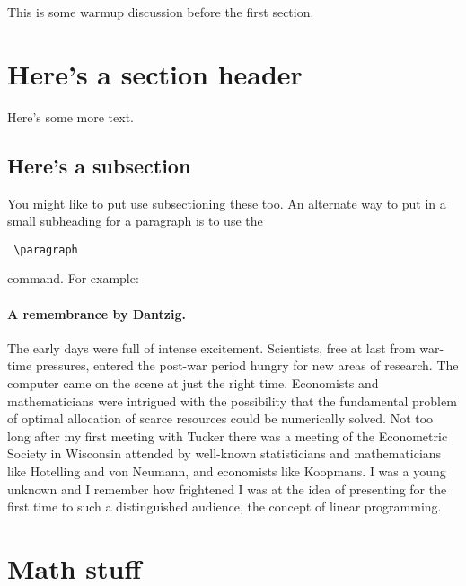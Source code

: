 




This is some warmup discussion before the first section.

\section{Here's a section header}

Here's some more text.

\subsection{Here's a subsection}

You might like to put use subsectioning these too.  An alternate way to put in a small subheading for a paragraph is to use the \begin{verbatim} \paragraph \end{verbatim} command.  For example:

\paragraph{A remembrance by Dantzig.}  The early days were full of intense excitement. Scientists, free at last from war-time pressures, entered the post-war period hungry for new areas of research. The computer came on the scene at just the right time. Economists and mathematicians were intrigued with the possibility that the fundamental problem of optimal allocation of scarce resources could be numerically solved. Not too long after my first meeting with Tucker there was a meeting of the Econometric Society in Wisconsin attended by well-known statisticians and mathematicians like Hotelling and von Neumann, and economists like Koopmans. I was a young unknown and I remember how frightened I was at the idea of presenting for the first time to such a distinguished audience, the concept of linear programming.



\section{Math stuff}

